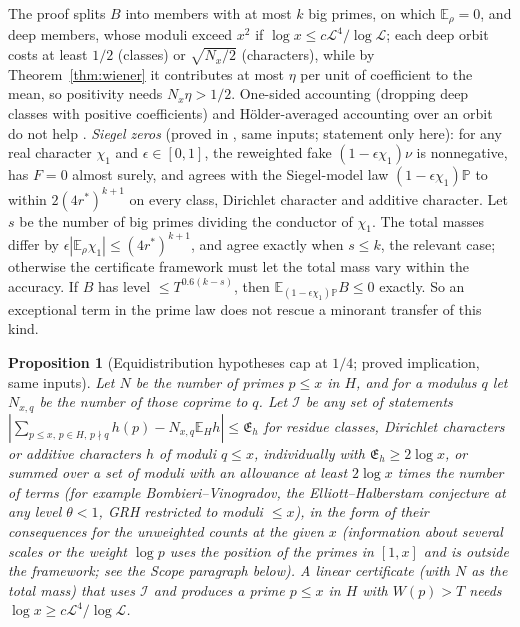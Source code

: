 \documentclass[11pt,reqno]{amsart}
\newtheorem{proposition}[theorem]{Proposition}
\theoremstyle{definition}
\newcommand{\Lc}{\mathcal L}
\newcommand{\E}{\mathbb E}
\newcommand{\PP}{\mathbb P}
\begin{document}
The proof \cite[Cor.~2.4]{O15} splits $B$ into members with at most $k$ big
primes, on which $\E_\rho=0$, and deep members, whose moduli exceed $x^2$ if
$\log x\le c\Lc^4/\log\Lc$; each deep orbit costs at least $1/2$ (classes) or
$\sqrt{N_x/2}$ (characters), while by Theorem~\ref{thm:wiener} it contributes at most
$\eta$ per unit of coefficient to the mean, so positivity needs $N_x\eta>1/2$.
One-sided accounting (dropping deep classes with positive coefficients)
and Hölder-averaged accounting over an orbit do not help
\cite[Cor.~2.4 and Prop.~2.5]{O15}.  \emph{Siegel zeros} (proved in \cite[Thm.~3.1]{O15}, same inputs; statement only here): for
any real character $\chi_1$ and $\epsilon\in[0,1]$, the reweighted fake $(1-\epsilon\chi_1)\nu$
is nonnegative, has $F=0$ almost surely, and agrees with the Siegel-model
law $(1-\epsilon\chi_1)\PP$ to within $2(4r^*)^{k+1}$ on every class, Dirichlet character
and additive character.  Let $s$ be the number of big primes dividing the
conductor of $\chi_1$.  The total masses differ by $\epsilon|\E_\rho\chi_1|\le(4r^*)^{k+1}$, and
agree exactly when $s\le k$, the relevant case; otherwise the certificate
framework must let the total mass vary within the accuracy.  If $B$ has
level $\le T^{0.6(k-s)}$, then $\E_{(1-\epsilon\chi_1)\PP}B\le0$ exactly.
So an exceptional term in the prime law does not rescue a minorant
transfer of this kind.

\begin{proposition}[Equidistribution hypotheses cap at $1/4$; proved implication, same inputs]\label{prop:EH}
Let $N$ be the number of primes $p\le x$ in $H$, and for a modulus $q$ let $N_{x,q}$
be the number of those coprime to $q$.  Let $\mathcal I$ be any set of statements
$|\sum_{p\le x,\,p\in H,\,p\nmid q}h(p)-N_{x,q}\E_Hh|\le\mathfrak E_h$ for residue classes, Dirichlet
characters or additive characters $h$ of moduli $q\le x$, individually with
$\mathfrak E_h\ge2\log x$, or summed over a set of moduli with an allowance at least
$2\log x$ times the number of terms (for example Bombieri--Vinogradov, the
Elliott--Halberstam conjecture at any level $\theta<1$, GRH restricted to
moduli $\le x$), in the form of their consequences for the unweighted counts
at the given $x$ (information about several scales or the weight $\log p$ uses
the position of the primes in $[1,x]$ and is outside the framework; see the
Scope paragraph below).  A linear certificate (with $N$ as the total mass) that uses
$\mathcal I$ and produces a prime $p\le x$ in $H$ with $W(p)>T$ needs
$\log x\ge c\Lc^4/\log\Lc$.
\end{proposition}
\end{document}
